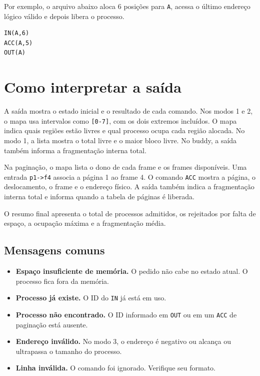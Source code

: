 \documentclass[11pt,a4paper]{article}
\newcommand{\cmd}[1]{\texttt{#1}}
\begin{document}
Por exemplo, o arquivo abaixo aloca 6 posições para \cmd{A}, acessa
o último endereço lógico válido e depois libera o processo.

\begin{verbatim}
IN(A,6)
ACC(A,5)
OUT(A)
\end{verbatim}

\section{Como interpretar a saída}

A saída mostra o estado inicial e o resultado de cada comando. Nos modos
1 e 2, o mapa usa intervalos como \cmd{[0-7]}, com os dois extremos
incluídos. O mapa indica quais regiões estão livres e qual processo ocupa
cada região alocada. No modo 1, a lista mostra o total livre e o maior
bloco livre. No buddy, a saída também informa a fragmentação interna total.

Na paginação, o mapa lista o dono de cada frame e os frames disponíveis.
Uma entrada \cmd{p1->f4} associa a página 1 ao frame 4. O comando
\cmd{ACC} mostra a página, o deslocamento, o frame e o endereço físico.
A saída também indica a fragmentação interna total e informa quando a
tabela de páginas é liberada.

O resumo final apresenta o total de processos admitidos, os rejeitados por
falta de espaço, a ocupação máxima e a fragmentação média.

\subsection*{Mensagens comuns}

\begin{itemize}
    \item \textbf{Espaço insuficiente de memória.} O pedido não cabe no
    estado atual. O processo fica fora da memória.
    \item \textbf{Processo já existe.} O ID do \cmd{IN} já está em uso.
    \item \textbf{Processo não encontrado.} O ID informado em \cmd{OUT}
    ou em um \cmd{ACC} de paginação está ausente.
    \item \textbf{Endereço inválido.} No modo 3, o endereço é negativo
    ou alcança ou ultrapassa o tamanho do processo.
    \item \textbf{Linha inválida.} O comando foi ignorado. Verifique seu formato.
\end{itemize}
\end{document}
